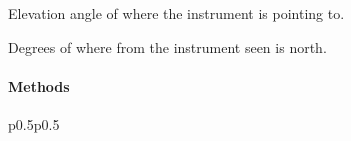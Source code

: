 \documentclass[letterpaper,10pt,english]{sphinxmanual}
\begin{document}
\begin{fulllineitems}
\begin{fulllineitems}
\end{fulllineitems}


\begin{fulllineitems}
\label{\detokenize{generated/MPPy.Instruments.Radar.Radar:MPPy.Instruments.Radar.Radar.elevation}}
Elevation angle of where the instrument is pointing to.

\end{fulllineitems}


\begin{fulllineitems}
\label{\detokenize{generated/MPPy.Instruments.Radar.Radar:MPPy.Instruments.Radar.Radar.north}}
Degrees of where from the instrument seen is north.

\end{fulllineitems}

\paragraph{Methods}


\begin{savenotes}\sphinxatlongtablestart\begin{longtable}{p{0.5\linewidth}p{0.5\linewidth}}
\hline

\endfirsthead

%
{}\\
\hline

\endhead

\hline
{}\\
\endfoot

\endlastfoot


\end{longtable}
\end{savenotes}
\end{fulllineitems}
\end{document}
